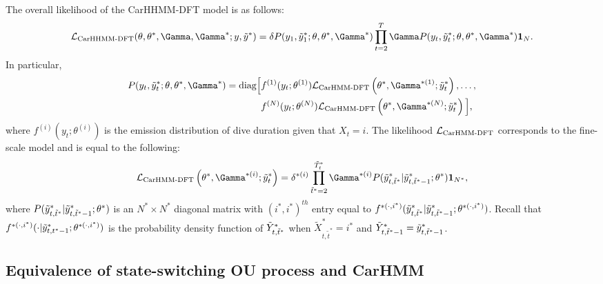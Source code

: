 The overall likelihood of the CarHHMM-DFT model is as follows:
%
$$\calL_{\text{CarHHMM-DFT}}(\theta,\theta^*,\Gamma,\Gamma^*;y,\z) = \delta P(y_1,\z_1;\theta,\theta^*,\Gamma^*) \prod_{t=2}^T \Gamma P(y_t,\z_t;\theta,\theta^*,\Gamma^*) \mathbf{1}_N.$$
%
In particular,
%
\begin{align*}
P(y_t,\z_t;\theta,\theta^*,\Gamma^*)  = \text{diag}\Big[&f^{(1)}(y_t;\theta^{(1)})\calL_{\text{CarHMM-DFT}}\left(\theta^*,\Gamma^{*(1)};\z_t\right), \ldots , \\
&f^{(N)}(y_t;\theta^{(N)})\calL_{\text{CarHMM-DFT}}\left(\theta^*,\Gamma^{*(N)};\z_t\right) \Big],
\end{align*}
%
where $f^{(i)}(y_t;\theta^{(i)})$ is the emission distribution of dive duration given that $X_t = i$. The likelihood $\mathcal{L}_{\text{CarHMM-DFT}}$ corresponds to the fine-scale model and is equal to the following:
%
$$\calL_{\text{CarHMM-DFT}}\left(\theta^{*},\Gamma^{*(i)};\z_t\right) = \delta^{*(i)} \prod_{\tilde t^* = 2}^{\tilde T^*_t} \Gamma^{*(i)} P(\z_{t,\tilde t^*}|\z_{t,\tilde t^*-1};\theta^*) \mathbf{1}_{N^*},$$
%
where $P(\tilde{y}^*_{t,\tilde t^*}|\tilde{y}^*_{t,\tilde t^*-1};\theta^*)$ is an $N^* \times N^*$ diagonal matrix with $(i^*,i^*)^{th}$ entry equal to $f^{*(\cdot,i^*)}(\tilde{y}^*_{t,\tilde t^*}|\tilde{y}^*_{t,\tilde t^*-1}; \theta^{*(\cdot,i^*)})$.
%
Recall that $f^{*(\cdot,i^*)}(\cdot|\tilde{y}^*_{t,t^*-1}; \theta^{*(\cdot,i^*)})$ is the probability density function of $\tilde{Y}^*_{t,\tilde t^*}$ when $\tilde X^*_{t,\tilde t^*} = i^*$ and $\tilde{Y}^*_{t,\tilde t^*-1} = \tilde{y}^*_{t,\tilde t^*-1}$.


\iffalse

\subsection{Equivalence of state-switching OU process and CarHMM}

